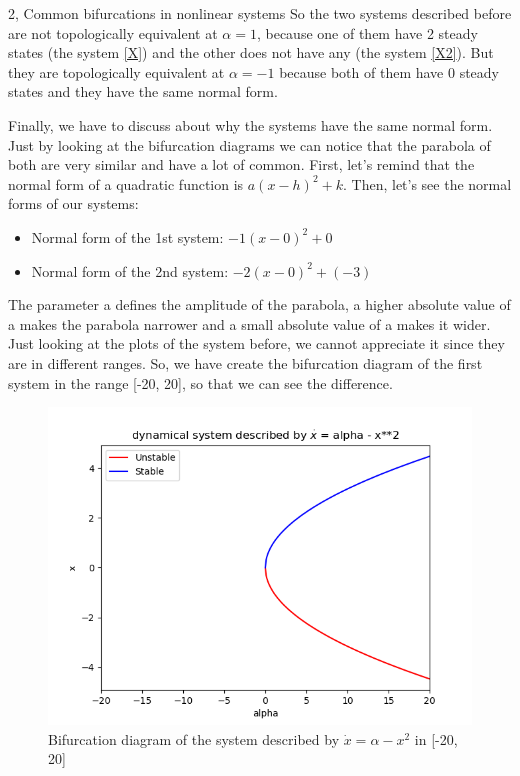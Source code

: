 \documentclass[10pt,a4paper]{article}
\begin{document}
\begin{task}{2, Common bifurcations in nonlinear systems}
So the two systems described before are not topologically equivalent at $\alpha = 1$, because one of them have 2 steady states (the system \ref{X}) and the other does not have any (the system \ref{X2}). But they are topologically equivalent at $\alpha = -1$ because both of them have 0 steady states and they have the same normal form.

Finally, we have to discuss about why the systems have the same normal form. Just by looking at the bifurcation diagrams we can notice that the parabola of both are very similar and have a lot of common. First, let's remind that the normal form of a quadratic function is $a(x - h)^2 + k$. Then, let's see the normal forms of our systems:
\begin{itemize}
  \item Normal form of the 1st system: $-1(x - 0)^2 + 0$
  \item Normal form of the 2nd system: $-2(x - 0)^2 + (-3)$
\end{itemize} 

The parameter a defines the amplitude of the parabola, a higher absolute value of a makes the parabola narrower and a small absolute value of a makes it wider. Just looking at the plots of the system before, we cannot appreciate it since they are in different ranges. So, we have create the bifurcation diagram of the first system in the range [-20, 20], so that we can see the difference. 
 
\begin{figure} [H]
    \centering
    \includegraphics[width=15cm]{images/function1_2.png}
    \caption{Bifurcation diagram of the system described by $\dot{x} = {\alpha} - x ^2$ in [-20, 20]}
    \label{function1_2}
\end{figure}


\end{task}
\end{document}
